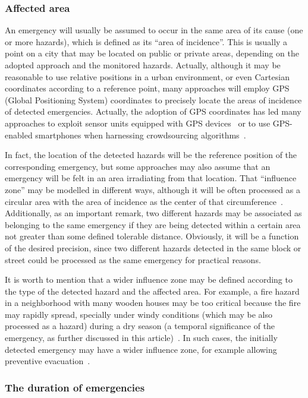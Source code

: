 \begin{refsection}
\subsubsection{Affected area}

An emergency will usually be assumed to occur in the same area of its cause (one or more hazards), which is defined as its ``area of incidence''. This is usually a point on a city that may be located on public or private areas, depending on the adopted approach and the monitored hazards. Actually, although it may be reasonable to use relative positions in a urban environment, or even Cartesian coordinates according to a reference point, many approaches will employ GPS (Global Positioning System) coordinates to precisely locate the areas of incidence of detected emergencies. Actually, the adoption of GPS coordinates has led many approaches to exploit sensor units equipped with GPS devices~\cite{smartsensing1} or to use GPS-enabled smartphones when harnessing crowdsourcing algorithms~\cite{smartsensing2}.

In fact, the location of the detected hazards will be the reference position of the corresponding emergency, but some approaches may also assume that an emergency will be felt in an area irradiating from that location. That ``influence zone'' may be modelled in different ways, although it will be often processed as a circular area with the area of incidence as the center of that circumference~\cite{s150614370}. Additionally, as an important remark, two different hazards may be associated as belonging to the same emergency if they are being detected within a certain area not greater than some defined tolerable distance. Obviously, it will be a function of the desired precision, since two different hazards detected in the same block or street could be processed as the same emergency for practical reasons.

It is worth to mention that a wider influence zone may be defined according to the type of the detected hazard and the affected area. For example, a fire hazard in a neighborhood with many wooden houses may be too critical because the fire may rapidly spread, specially under windy conditions (which may be also processed as a hazard) during a dry season (a temporal significance of the emergency, as further discussed in this article)~\cite{iotFire2}. In such cases, the initially detected emergency may have a wider influence zone, for example allowing preventive evacuation~\cite{evacuation}.

\subsubsection{The duration of emergencies}


\end{refsection}
